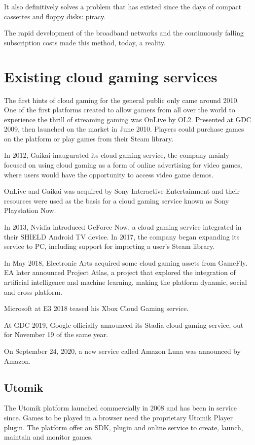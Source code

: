 It also definitively solves a problem that has existed since the days of compact cassettes and floppy disks: piracy.

The rapid development of the broadband networks and the continuously falling subscription costs made this method, today, a reality.

\section{Existing cloud gaming services}
The first hints of cloud gaming for the general public only came around 2010. One of the first platforms created to allow gamers from all over the world to experience the thrill of streaming gaming was OnLive by OL2. Presented at GDC 2009, then launched on the market in June 2010. Players could purchase games on the platform or play games from their Steam library.

In 2012, Gaikai inaugurated its cloud gaming service, the company mainly focused on using cloud gaming as a form of online advertising for video games, where users would have the opportunity to access video game demos.

OnLive and Gaikai was acquired by Sony Interactive Entertainment and their resources were used as the basis for a cloud gaming service known as Sony Playstation Now.

In 2013, Nvidia introduced GeForce Now, a cloud gaming service integrated in their SHIELD Android TV device. In 2017, the company began expanding its service to PC, including support for importing a user's Steam library.

In May 2018, Electronic Arts acquired some cloud gaming assets from GameFly. EA later announced Project Atlas, a project that explored the integration of artificial intelligence and machine learning, making the platform dynamic, social and cross platform.

Microsoft at E3 2018 teased his Xbox Cloud Gaming service.

At GDC 2019, Google officially announced its Stadia cloud gaming service, out for November 19 of the same year.

On September 24, 2020, a new service called Amazon Luna was announced by Amazon\cite{Cloud_gaming_history}.
\subsection{Utomik}
The Utomik platform launched commercially in 2008 and has been in service since. Games to be played in a browser need the proprietary Utomik Player plugin. The platform offer an SDK, plugin and online service to create, launch, maintain and monitor games\cite{Utomik}.
